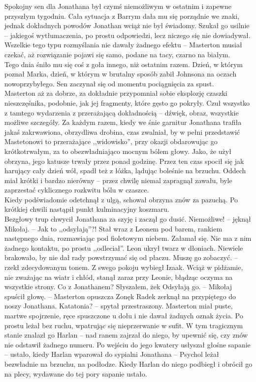 \documentclass[../MAIN.tex]{subfiles}
\begin{document}
Spokojny sen dla Jonathana był czymś niemożliwym w ostatnim i zapewne przyszłym tygodniu. Cała sytuacja z Barrym dała mu się porządnie we znaki, jednak dokładnych powodów Jonathan wciąż nie był świadomy. Szukał go usilnie -- jakiegoś wytłumaczenia, po prostu odpowiedzi, lecz niczego się nie dowiadywał. Wszelkie tego typu rozmyślania nie dawały żadnego efektu -- Masterton musiał czekać, aż rozwiązanie pojawi się samo, podane na tacy, czarno na białym.\\
Tego dnia śniło mu się coś z goła innego, niż ostatnim razem. Dzień, w którym poznał Marka, dzień, w którym w brutalny sposób zabił Johnsona na oczach nowoprzybyłego. Sen zaczynał się od momentu pociągnięcia za spust.\\
Masterton aż za dobrze, za dokładnie przypomniał sobie eksplozję czaszki nieszczęśnika, podobnie, jak jej fragmenty, które gęsto go pokryły. Czuł wszystko z tamtego wydarzenia z przerażającą dokładnością -- dźwięk, obraz, wszystkie możliwe szczegóły. Za każdym razem, kiedy we śnie garnitur Jonathana trafiła jakaś zakrwawiona, obrzydliwa drobina, czas zwalniał, by w pełni przedstawić Mastetonowi to przerażające ,,widowisko'', przy okazji obdarowując go krótkotrwałym, za to obezwładniająco mocnym bólem głowy. Jako, że użył obrzyna, jego katusze trwały przez ponad godzinę. Przez ten czas spocił się jak harujący cały dzień wół, spadł też z łóżka, lądując boleśnie na brzuchu. Oddech miał krótki i bardzo nierówny -- przez chwilę niemal zapragnął zawału, byle zaprzestać cyklicznego rozkwitu bólu w czaszce.\\
Kiedy podświadomie odetchnął z ulgą, schował obrzyna znów za pazuchą. Po krótkiej chwili nastąpił punkt kulminacyjny koszmaru.\\
Bezgłowy trup chwycił Jonathana za szyję i zaczął go dusić.
\sx Niemożliwe! -- jęknął Mikołaj. -- Jak to ,,odsyłają''?!
Stał wraz z Leonem pod barem, rankiem następnego dnia, rozmawiając pod fioletowym niebem.
\xx Załamał się. Nie ma z nim żadnego kontaktu, po prostu ,,odleciał''.
Leon ukrył twarz w dłoniach. Niewiele brakowało, by nie dał rady powstrzymać się od płaczu.
\xx Muszę go zobaczyć. -- rzekł zdecydowanym tonem.
\qd
Z swego pokoju wybiegł Izaak. Wciąż w pidżamie, nie zważając na wiatr i chłód, stanął zaraz przy Leonie, błądząc oczyma na wszystkie strony.
\sx Co z Jonathanem? Słyszałem, że\3k
\xx Odsyłają go. -- Mikołaj spuścił głowę. -- Masterton opuszcza Zonę\3k
\qd
Radek zerknął na przypiętego do noszy Jonathana.
\sx Katatonia? -- spytał przestraszony.
\qd
Masterton miał puste, martwe spojrzenie, ręce spuszczone u dołu i nie dawał żadnych oznak życia. Po prostu leżał bez ruchu, wpatrując się nieprzerwanie w sufit. W tym tragicznym stanie znalazł go Harlan -- nad ranem zajrzał do niego, by upewnić się, czy znów nie odstawił żadnego numeru. Po wejściu do jego kwatery usłyszał głośne sapanie -- ustało, kiedy Harlan wparował do sypialni Jonathana -- Psychol leżał bezwładnie na brzuchu, na podłodze. Kiedy Harlan do niego podbiegł i obrócił go na plecy, wydawane do tej pory sapanie ustało.\\
\end{document}

